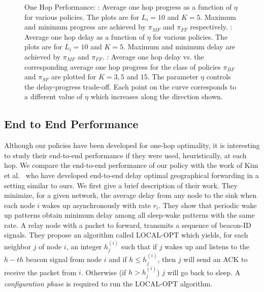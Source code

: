 \documentclass[onecolumn]{IEEEtran}
\begin{document}
\begin{figure*}[t]
  \centering
{}
\caption{One Hop Performance: : Average one hop progress 
  as a function of $\eta$ for  various policies. The plots are for
  $L_i=10$ and $K=5$. Maximum and minimum progress are achieved by
  $\pi_{MF}$ and $\pi_{FF}$ respectively. : Average one hop delay
  as a function of $\eta$ for  various
  policies. The plots are for $L_i=10$ and $K=5$. Maximum and minimum
  delay are achieved by $\pi_{MF}$ and $\pi_{FF}$. : Average one
  hop delay vs. the corresponding average one hop progress for the class of policies $\pi_{BF}$ and $\pi_{SF}$ are
  plotted for $K=3, 5$ and $15$. The  parameter $\eta$ controls the delay-progress trade-off. Each point
  on the curve corresponds to a different value of $\eta$ which
  increases along the direction shown.}
\end{figure*}

\subsection{End to End Performance} \label{end_subsec} 

Although our policies have been developed for one-hop optimality, it
is interesting to study their end-to-end performance if they were
used, heuristically, at each hop.  We compare the end-to-end
performance of our policy with the work of Kim et
al.~\cite{kim-etal09optimal-anycast} who have developed end-to-end
delay optimal geographical forwarding in a setting similar to ours. We
first give a brief description of their work. They minimize, for a
given network, the average delay from any node to the sink when each
node $i$ wakes up asynchronously with rate $r_i$. They show that
periodic wake up patterns obtain minimum delay among all sleep-wake
patterns with the same rate. A relay node with a packet to forward,
transmits a sequence of beacon-ID signals. They propose an algorithm
called LOCAL-OPT \cite{kim-etal08tech-report} which yields, for each
neighbor $j$ of node $i$, an integer $h_j^{(i)}$ such that if $j$
wakes up and listens to the $h-th$ beacon signal from node $i$ and if
$h \le h_j^{(i)}$, then $j$ will send an ACK to receive the packet
from $i$. Otherwise (if $h > h_j^{(i)}$) $j$ will go back to sleep. A
\emph{configuration phase} is required to run the LOCAL-OPT algorithm.
\end{document}
